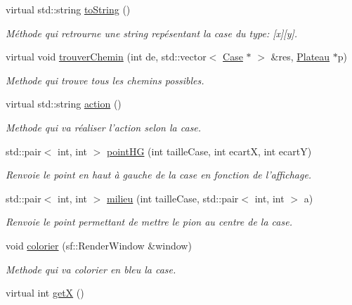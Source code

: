 \begin{DoxyCompactItemize}
\item 
virtual std\-::string \hyperlink{classCase_ad09ca1072f39bcacf06459fc03f026ae}{to\-String} ()
\begin{DoxyCompactList}\small\item\em \-Méthode qui retrourne une string repésentant la case du type\-: \mbox{[}x\mbox{]}\mbox{[}y\mbox{]}. \end{DoxyCompactList}\item 
virtual void \hyperlink{classCase_affe73b57a2c81e2f09dc5db45893db3c}{trouver\-Chemin} (int de, std\-::vector$<$ \hyperlink{classCase}{\-Case} $\ast$ $>$ \&res, \hyperlink{classPlateau}{\-Plateau} $\ast$p)
\begin{DoxyCompactList}\small\item\em \-Methode qui trouve tous les chemins possibles. \end{DoxyCompactList}\item 
virtual std\-::string \hyperlink{classCase_acdbbc0ad8422141cdbf2e647d1ba56e1}{action} ()
\begin{DoxyCompactList}\small\item\em \-Methode qui va réaliser l'action selon la case. \end{DoxyCompactList}\item 
std\-::pair$<$ int, int $>$ \hyperlink{classCase_ae6ce55820f949e5fae8dbeb62d298291}{point\-H\-G} (int taille\-Case, int ecart\-X, int ecart\-Y)
\begin{DoxyCompactList}\small\item\em \-Renvoie le point en haut à gauche de la case en fonction de l'affichage. \end{DoxyCompactList}\item 
std\-::pair$<$ int, int $>$ \hyperlink{classCase_a48b794ecbea4155843ce09f53e280237}{milieu} (int taille\-Case, std\-::pair$<$ int, int $>$ a)
\begin{DoxyCompactList}\small\item\em \-Renvoie le point permettant de mettre le pion au centre de la case. \end{DoxyCompactList}\item 
void \hyperlink{classCase_ad7cbf9289ac69b4e1c1f3fc20a6fa540}{colorier} (sf\-::\-Render\-Window \&window)
\begin{DoxyCompactList}\small\item\em \-Methode qui va colorier en bleu la case. \end{DoxyCompactList}\item 
virtual int \hyperlink{classCase_ab5580b919199dd2ec379672d3390bbff}{get\-X} ()

\end{DoxyCompactItemize}
